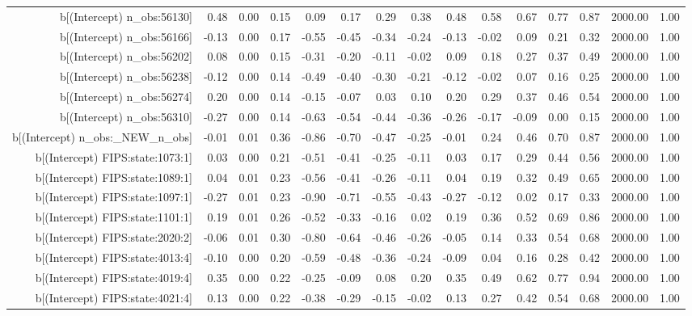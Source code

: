 \begin{table}[ht]
\begin{tabular}{rrrrrrrrrrrrrrr}
  b[(Intercept) n\_obs:56130] & 0.48 & 0.00 & 0.15 & 0.09 & 0.17 & 0.29 & 0.38 & 0.48 & 0.58 & 0.67 & 0.77 & 0.87 & 2000.00 & 1.00 \\ 
  b[(Intercept) n\_obs:56166] & -0.13 & 0.00 & 0.17 & -0.55 & -0.45 & -0.34 & -0.24 & -0.13 & -0.02 & 0.09 & 0.21 & 0.32 & 2000.00 & 1.00 \\ 
  b[(Intercept) n\_obs:56202] & 0.08 & 0.00 & 0.15 & -0.31 & -0.20 & -0.11 & -0.02 & 0.09 & 0.18 & 0.27 & 0.37 & 0.49 & 2000.00 & 1.00 \\ 
  b[(Intercept) n\_obs:56238] & -0.12 & 0.00 & 0.14 & -0.49 & -0.40 & -0.30 & -0.21 & -0.12 & -0.02 & 0.07 & 0.16 & 0.25 & 2000.00 & 1.00 \\ 
  b[(Intercept) n\_obs:56274] & 0.20 & 0.00 & 0.14 & -0.15 & -0.07 & 0.03 & 0.10 & 0.20 & 0.29 & 0.37 & 0.46 & 0.54 & 2000.00 & 1.00 \\ 
  b[(Intercept) n\_obs:56310] & -0.27 & 0.00 & 0.14 & -0.63 & -0.54 & -0.44 & -0.36 & -0.26 & -0.17 & -0.09 & 0.00 & 0.15 & 2000.00 & 1.00 \\ 
  b[(Intercept) n\_obs:\_NEW\_n\_obs] & -0.01 & 0.01 & 0.36 & -0.86 & -0.70 & -0.47 & -0.25 & -0.01 & 0.24 & 0.46 & 0.70 & 0.87 & 2000.00 & 1.00 \\ 
  b[(Intercept) FIPS:state:1073:1] & 0.03 & 0.00 & 0.21 & -0.51 & -0.41 & -0.25 & -0.11 & 0.03 & 0.17 & 0.29 & 0.44 & 0.56 & 2000.00 & 1.00 \\ 
  b[(Intercept) FIPS:state:1089:1] & 0.04 & 0.01 & 0.23 & -0.56 & -0.41 & -0.26 & -0.11 & 0.04 & 0.19 & 0.32 & 0.49 & 0.65 & 2000.00 & 1.00 \\ 
  b[(Intercept) FIPS:state:1097:1] & -0.27 & 0.01 & 0.23 & -0.90 & -0.71 & -0.55 & -0.43 & -0.27 & -0.12 & 0.02 & 0.17 & 0.33 & 2000.00 & 1.00 \\ 
  b[(Intercept) FIPS:state:1101:1] & 0.19 & 0.01 & 0.26 & -0.52 & -0.33 & -0.16 & 0.02 & 0.19 & 0.36 & 0.52 & 0.69 & 0.86 & 2000.00 & 1.00 \\ 
  b[(Intercept) FIPS:state:2020:2] & -0.06 & 0.01 & 0.30 & -0.80 & -0.64 & -0.46 & -0.26 & -0.05 & 0.14 & 0.33 & 0.54 & 0.68 & 2000.00 & 1.00 \\ 
  b[(Intercept) FIPS:state:4013:4] & -0.10 & 0.00 & 0.20 & -0.59 & -0.48 & -0.36 & -0.24 & -0.09 & 0.04 & 0.16 & 0.28 & 0.42 & 2000.00 & 1.00 \\ 
  b[(Intercept) FIPS:state:4019:4] & 0.35 & 0.00 & 0.22 & -0.25 & -0.09 & 0.08 & 0.20 & 0.35 & 0.49 & 0.62 & 0.77 & 0.94 & 2000.00 & 1.00 \\ 
  b[(Intercept) FIPS:state:4021:4] & 0.13 & 0.00 & 0.22 & -0.38 & -0.29 & -0.15 & -0.02 & 0.13 & 0.27 & 0.42 & 0.54 & 0.68 & 2000.00 & 1.00 \\ 

\end{tabular}
\end{table}
